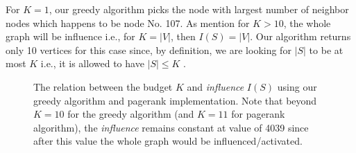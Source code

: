 For $K=1$, our greedy algorithm picks the node with largest number of neighbor nodes which happens to be node No. 107. As mention for $K>10$, the whole graph will be influence i.e., for $K=|V|$, then $I(S) = |V|$. Our algorithm returns only 10 vertices for this case since, by definition, we are looking for $|S|$ to be at most $K$ i.e., it is allowed to have $|S|\leq K$ .

\begin{figure}[!tbh]
\centering        
   \caption{The relation between the budget $K$ and {\itshape{influence}} $I(S)$ using our greedy algorithm and pagerank implementation. Note that beyond $K=10$ for the greedy algorithm (and $K=11$ for pagerank algorithm), the {\itshape{influence}} remains constant at value of 4039 since after this value the whole graph would be influenced/activated.  }
   \label{fig:inf}
\end{figure}



